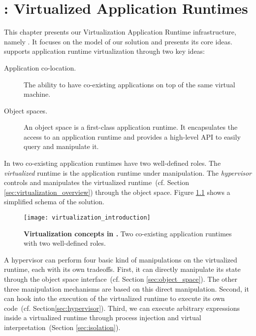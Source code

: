 

\chapter{\VTT: Virtualized Application Runtimes}
\minitoc
\introduction

This chapter presents our Virtualization Application Runtime infrastructure, namely \VTT. It focuses on the model of our solution and presents its core ideas. \VTT supports application runtime virtualization through two key ideas:

\begin{description}
\item[Application co-location.] The ability to have co-existing applications on top of the same virtual machine. 
\item[Object spaces.] An object space is a first-class application runtime. It encapsulates the access to an application runtime and provides a high-level API to easily query and manipulate it.
\end{description}

In \Vtt two co-existing application runtimes have two well-defined roles. The \emph{virtualized} runtime is the application runtime under manipulation. The \emph{hypervisor} controls and manipulates the virtualized runtime~(cf. Section \ref{sec:virtualization_overview}) through the object space.
Figure \ref{fig:virtualization_introduction} shows a simplified schema of the solution.

\begin{figure}[htb]
\begin{center}
\texttt{[image: virtualization\_introduction]}
\caption{\textbf{Virtualization concepts in \Vtt.} Two co-existing application runtimes with two well-defined roles.\label{fig:virtualization_introduction}}
\end{center}
\end{figure}

A hypervisor can perform four basic kind of manipulations on the virtualized runtime, each with its own tradeoffs. First, it can directly manipulate its state through the object space interface~(cf. Section \ref{sec:object_space}). The other three manipulation mechanisms are based on this direct manipulation. Second, it can hook into the execution of the virtualized runtime to execute its own code~(cf. Section\ref{sec:hypervisor}). Third, we can execute arbitrary expressions inside a virtualized runtime through process injection and virtual interpretation~(Section \ref{sec:isolation}). %


